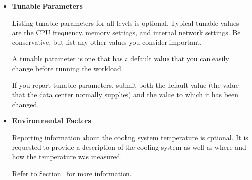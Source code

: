 \begin{itemize}



To estimate the power consumption of a subsystem when measurement is not possible, use an upper bound derived from the maximum specified power consumption of all hardware components.
The submission must include the relevant manufacturer specifications and formulas used for power estimation.

Include additional subsystems if needed.

Refer to Section~ for more information about included subsystems.

Refer to Section~ for information about measuring a subset of the compute subsystem and extrapolating.
 
\item[{[ ]}]
\textbf{Tunable Parameters}

Listing tunable parameters for all levels is optional.
Typical tunable values are the CPU frequency, memory settings, and internal network settings.
Be conservative, but list any other values you consider important.

A tunable parameter is one that has a default value that you can easily change before running the workload.

If you report tunable parameters, submit both the default value (the value that the data center normally supplies) and the value to which it has been changed.

\item[{[ ]}]
\textbf{Environmental Factors}

Reporting information about the cooling system temperature is optional.
It is requested to provide a description of the cooling system as well as where and how the temperature was measured.

Refer to Section~ for more information.

\end{itemize}
